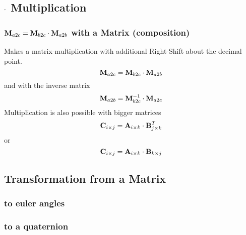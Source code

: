 \subsection{$\multiplication$ Multiplication}
\subsubsection*{$\mat M_{a2c} = \mat M_{b2c} \multiplication \mat M_{a2b}$ with a Matrix (composition)}
Makes a matrix-multiplication with additional Right-Shift about the decimal point.
\begin{equation}
\mat M_{a2c} = \mat M_{b2c} \multiplication \mat M_{a2b}
\end{equation}
and with the inverse matrix
\begin{equation}
\mat M_{a2b} = \inv{\mat M_{b2c}} \multiplication \mat M_{a2c}
\end{equation}
Multiplication is also possible with bigger matrices
\begin{equation}
\mat C_{i \cross j} = \mat A_{i \cross k} \multiplication \transp{\mat B_{j \cross k}}
\end{equation}
or
\begin{equation}
\mat C_{i \cross j} = \mat A_{i \cross k} \multiplication \mat B_{k \cross j}
\end{equation}


\subsection{Transformation from a Matrix}
\subsubsection*{to euler angles}


\subsubsection*{to a quaternion}




